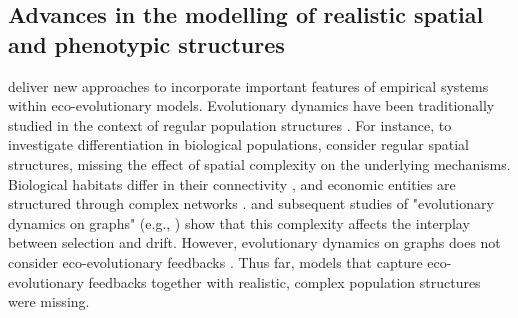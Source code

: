 % 

\subsection{Advances in the modelling of realistic spatial and phenotypic structures}

\Cref{\chapi,\chapiv} deliver new approaches to incorporate important features of empirical systems within eco-evolutionary models.
% 
% 
Evolutionary dynamics have been traditionally studied in the context of regular population structures \citep{LiebermanHauert2005}.
% 
For instance, to investigate differentiation in biological populations, \cite{Slatkin1973,Slatkin1978,Kirkpatrick1997,Polechova2015,Polechova2018,AndradeRestrepo2019,Doebeli2003,Meszena1997,Yeaman2011,Debarre2013,Mirrahimi2020} consider regular spatial structures, missing the effect of spatial complexity on the underlying mechanisms.
% 
Biological habitats differ in their connectivity \citep{Dale2010}, and economic entities are structured through complex networks \citep{Schweitzer2009}. \cite{LiebermanHauert2005} and subsequent studies of "evolutionary dynamics on graphs" (e.g., \cite{Tkadlec2019}) show that this complexity affects the interplay between selection and drift. However, evolutionary dynamics on graphs does not consider eco-evolutionary feedbacks \citep{Govaert2019}.
% 
Thus far, models that capture eco-evolutionary feedbacks together with realistic, complex population structures were missing.

